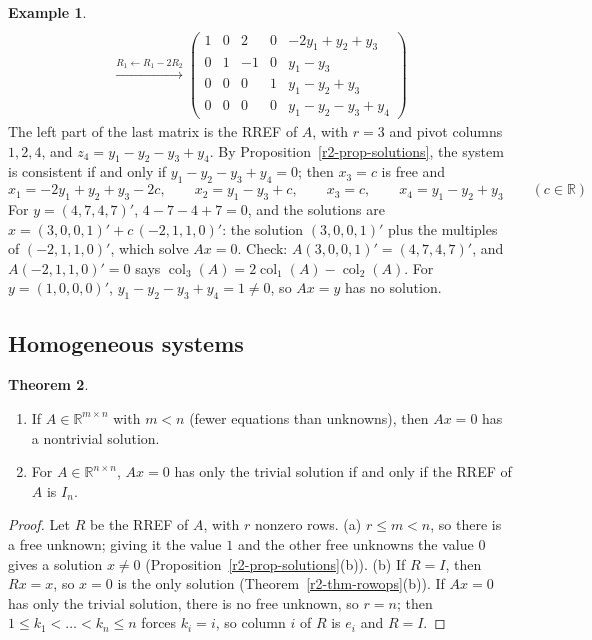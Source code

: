 \documentclass[12pt]{article}
\newcommand{\R}{\mathbb R}
\DeclareMathOperator{\col}{col}
\theoremstyle{definition}
\newtheorem{theorem}{Theorem}
\newtheorem{example}[theorem]{Example}
\begin{document}
\begin{example}
\[\begin{gathered}
\\
\xrightarrow{R_1\leftarrow R_1-2R_2}
\left(\begin{array}{cccc|c}1&0&2&0&-2y_1+y_2+y_3\\0&1&-1&0&y_1-y_3\\0&0&0&1&y_1-y_2+y_3\\0&0&0&0&y_1-y_2-y_3+y_4\end{array}\right)
\end{gathered}
\]
The left part of the last matrix is the RREF of \(A\), with \(r=3\) and pivot columns
\(1,2,4\), and \(z_4=y_1-y_2-y_3+y_4\). By Proposition~\ref{r2-prop-solutions}, the system is
consistent if and only if \(y_1-y_2-y_3+y_4=0\); then \(x_3=c\) is free and
\[
x_1=-2y_1+y_2+y_3-2c,\qquad x_2=y_1-y_3+c,\qquad x_3=c,\qquad x_4=y_1-y_2+y_3\qquad(c\in\R)
\]
For \(y=(4,7,4,7)'\), \(4-7-4+7=0\), and the solutions are
\(x=(3,0,0,1)'+c\,(-2,1,1,0)'\): the solution \((3,0,0,1)'\) plus the multiples of
\((-2,1,1,0)'\), which solve \(Ax=0\). Check: \(A(3,0,0,1)'=(4,7,4,7)'\), and
\(A(-2,1,1,0)'=0\) says \(\col_3(A)=2\col_1(A)-\col_2(A)\). For \(y=(1,0,0,0)'\),
\(y_1-y_2-y_3+y_4=1\ne0\), so \(Ax=y\) has no solution.
\end{example}

\subsection*{Homogeneous systems}

\begin{theorem}\label{r2-thm-homogeneous}
\begin{enumerate}
\item If \(A\in\R^{m\times n}\) with \(m<n\) (fewer equations than unknowns), then \(Ax=0\)
has a nontrivial solution.
\item For \(A\in\R^{n\times n}\), \(Ax=0\) has only the trivial solution if and only if the
RREF of \(A\) is \(I_n\).
\end{enumerate}
\end{theorem}
\begin{proof}
Let \(R\) be the RREF of \(A\), with \(r\) nonzero rows. (a) \(r\leqslant m<n\), so there is
a free unknown; giving it the value \(1\) and the other free unknowns the value \(0\) gives a
solution \(x\ne0\) (Proposition~\ref{r2-prop-solutions}(b)). (b) If \(R=I\), then \(Rx=x\),
so \(x=0\) is the only solution (Theorem~\ref{r2-thm-rowops}(b)). If \(Ax=0\) has only the trivial
solution, there is no free unknown, so \(r=n\); then \(1\leqslant k_1<\dots<k_n\leqslant n\) forces \(k_i=i\), so column
\(i\) of \(R\) is \(e_i\) and \(R=I\).
\end{proof}
\end{document}
